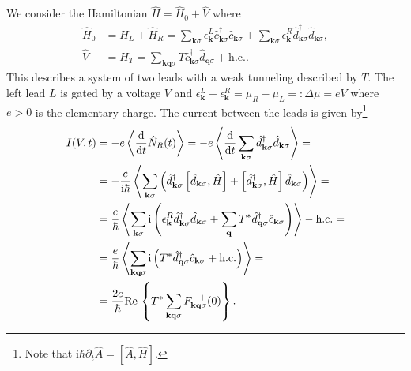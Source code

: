 \documentclass[english, parskip=full]{scrartcl}
\title{\titel}
\author{\autor}
\date{\today}
\newcommand{\kla}{}
\newcommand{\klam}{}
\newcommand{\klammer}{}
\newcommand{\tecxt}{}
\renewcommand{\i}{\text{i}}
\begin{document}
\maketitle  %

We consider the Hamiltonian $\hat{H} = \hat{H}_0 + \hat{V}$ where 
\begin{align}
\hat{H}_0 &= \hat{H}_L + \hat{H}_R = \sum_{\textbf{k}\sigma} \epsilon_\textbf{k}^L \hat{c}_{\textbf{k}\sigma}^\dagger \hat{c}_{\textbf{k}\sigma} + \sum_{\textbf{k}\sigma} \epsilon_\textbf{k}^R \hat{d}_{\textbf{k}\sigma}^\dagger \hat{d}_{\textbf{k}\sigma},\\
\hat{V} &= \hat{H}_T = \sum_{\textbf{k}\textbf{q}\sigma} T\hat{c}_{\textbf{k}\sigma}^\dagger \hat{d}_{\textbf{q}\sigma} + \tecxt\text{h.c..}
\end{align}
This describes a system of two leads with a weak tunneling described by $T$.
The left lead $L$ is gated by a voltage $V$ and $\epsilon_\textbf{k}^L - \epsilon_\textbf{k}^R = \mu_R - \mu_L =: \Delta\mu = eV$ where $e>0$ is the elementary charge.
The current between the leads is given by\footnote{Note that $\i\hbar \partial_t \hat{A} = \klam\left[ \hat{A}, \hat{H} \right]$.}
\begin{align}
I(V,t) &= -e \left\langle \frac{\tecxt\text{d}}{\tecxt\text{d}t} \hat{N}_R(t) \right\rangle = -e \left\langle \frac{\tecxt\text{d}}{\tecxt\text{d}t} \sum_{\textbf{k}\sigma} \hat{d}_{\textbf{k}\sigma}^\dagger \hat{d}_{\textbf{k}\sigma} \right\rangle = \\
&= -\frac{e}{\i\hbar} \left\langle \sum_{\textbf{k}\sigma} \kla\left(  \hat{d}_{\textbf{k}\sigma}^\dagger \left[ \hat{d}_{\textbf{k}\sigma}, \hat{H} \right] + \left[ \hat{d}_{\textbf{k}\sigma}^\dagger, \hat{H} \right] \hat{d}_{\textbf{k}\sigma} \right) \right\rangle = \\
&= \frac{e}{\hbar} \left\langle \sum_{\textbf{k}\sigma} \i \kla\left( \epsilon_\textbf{k}^R \hat{d}_{\textbf{k}\sigma}^\dagger \hat{d}_{\textbf{k}\sigma} + \sum_\textbf{q} T^\ast \hat{d}_{\textbf{q}\sigma}^\dagger \hat{c}_{\textbf{k}\sigma}\right) \right\rangle - \tecxt\text{h.c.}  = \\
&= \frac{e}{\hbar} \left\langle \sum_{\textbf{k}\textbf{q}\sigma} \i \kla\left( T^\ast \hat{d}_{\textbf{q}\sigma}^\dagger \hat{c}_{\textbf{k}\sigma} + \tecxt\text{h.c.} \right) \right\rangle = \\
&= \frac{2e}{\hbar} \tecxt\text{Re\,} \klammer\left\{ T^\ast \sum_{\textbf{k}\textbf{q}\sigma} F_{\textbf{k} \textbf{q}\sigma}^{-+}(0) \right\}.
\end{align}
\end{document}
